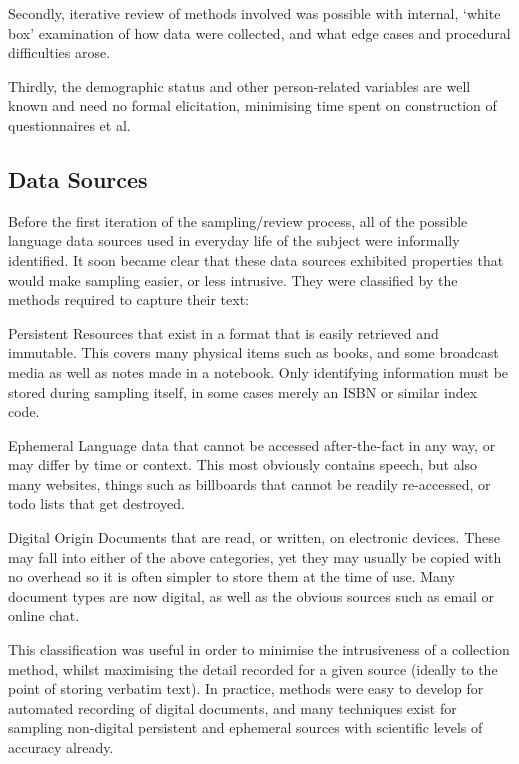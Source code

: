 Secondly, iterative review of methods involved was possible with internal, `white box' examination of how data were collected, and what edge cases and procedural difficulties arose.

Thirdly, the demographic status and other person-related variables are well known and need no formal elicitation, minimising time spent on construction of questionnaires et al.


\subsection{Data Sources}
Before the first iteration of the sampling/review process, all of the possible language data sources used in everyday life of the subject were informally identified.  It soon became clear that these data sources exhibited properties that would make sampling easier, or less intrusive.  They were classified by the methods required to capture their text:

\begin{itemizeTitle}
    \item[Persistent] Resources that exist in a format that is easily retrieved and immutable.  This covers many physical items such as books, and some broadcast media as well as notes made in a notebook.  Only identifying information must be stored during sampling itself, in some cases merely an ISBN or similar index code.
    \item[Ephemeral] Language data that cannot be accessed after-the-fact in any way, or may differ by time or context.  This most obviously contains speech, but also many websites, things such as billboards that cannot be readily re-accessed, or todo lists that get destroyed.
    \item[Digital Origin] Documents that are read, or written, on electronic devices.  These may fall into either of the above categories, yet they may usually be copied with no overhead so it is often simpler to store them at the time of use.  Many document types are now digital, as well as the obvious sources such as email or online chat.
\end{itemizeTitle}

This classification was useful in order to minimise the intrusiveness of a collection method, whilst maximising the detail recorded for a given source (ideally to the point of storing verbatim text).  In practice, methods were easy to develop for automated recording of digital documents, and many techniques exist for sampling non-digital persistent and ephemeral sources with scientific levels of accuracy already.

